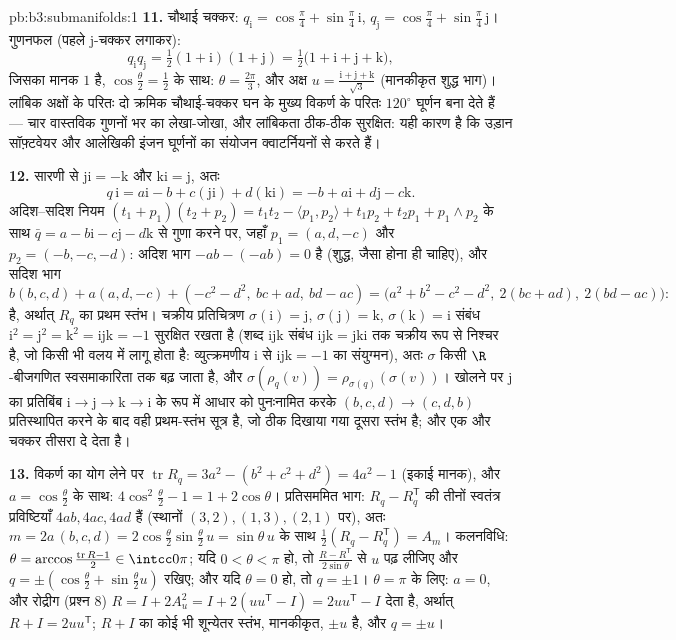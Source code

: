 \begin{solution}{pb:b3:submanifolds:1}
\textbf{11.} चौथाई चक्कर: $q_{\mathrm i} =
\cos\frac\pi4 + \sin\frac\pi4\,\mathrm i$, $q_{\mathrm j} =
\cos\frac\pi4 + \sin\frac\pi4\,\mathrm j$। गुणनफल (पहले $\mathrm j$-चक्कर
लगाकर):
\[
q_{\mathrm i}q_{\mathrm j} = \tfrac12(1 + \mathrm i)(1 +
\mathrm j) = \tfrac12\bigl(1 + \mathrm i + \mathrm j +
\mathrm k\bigr),
\]
जिसका मानक $1$ है, $\cos\frac\theta2 = \frac12$ के साथ: $\theta =
\frac{2\pi}3$, और अक्ष $u = \frac{\mathrm i + \mathrm j +
\mathrm k}{\sqrt3}$ (मानकीकृत
शुद्ध भाग)। लांबिक अक्षों के परितः दो क्रमिक चौथाई-चक्कर घन के मुख्य
विकर्ण के परितः $120^\circ$ घूर्णन बना देते हैं --- चार वास्तविक गुणनों
भर का लेखा-जोखा, और लांबिकता ठीक-ठीक सुरक्षित: यही कारण है कि उड़ान
सॉफ़्टवेयर और आलेखिकी इंजन घूर्णनों का संयोजन क्वाटर्नियनों से करते
हैं।

\textbf{12.} सारणी से $\mathrm{ji} = -\mathrm k$ और $\mathrm{ki} = \mathrm j$, अतः
\[
q\,\mathrm i = a\mathrm i - b + c(\mathrm{ji}) +
d(\mathrm{ki}) = -b + a\mathrm i + d\mathrm j - c\mathrm k .
\]
अदिश--सदिश नियम $(t_1 + p_1)(t_2 +
p_2) = t_1t_2 - \langle p_1, p_2\rangle + t_1p_2 + t_2p_1 +
p_1\wedge p_2$ के साथ $\bar q = a - b\mathrm i - c\mathrm j -
d\mathrm k$ से गुणा करने पर, जहाँ $p_1 = (a, d, -c)$ और
$p_2 = (-b, -c,
-d)$: अदिश भाग $-ab - (-ab) = 0$ है (शुद्ध, जैसा होना ही चाहिए), और सदिश भाग
\[
b(b, c, d) + a(a, d, -c) + (-c^2 - d^2,\ bc + ad,\ bd - ac)
= \bigl(a^2 + b^2 - c^2 - d^2,\ 2(bc + ad),\ 2(bd -
ac)\bigr):
\]
है, अर्थात् $R_q$ का प्रथम स्तंभ। चक्रीय प्रतिचित्रण $\sigma(\mathrm i)
= \mathrm j$, $\sigma(\mathrm j) = \mathrm k$,
$\sigma(\mathrm k) = \mathrm i$ संबंध $\mathrm i^2 = \mathrm j^2 = \mathrm k^2 = \mathrm{ijk} =
-1$ सुरक्षित रखता है (शब्द $\mathrm{ijk}$ संबंध $\mathrm{ijk} = \mathrm{jki}$ तक चक्रीय
रूप से निश्चर है, जो किसी भी वलय में लागू होता है: व्युत्क्रमणीय
$\mathrm i$ से $\mathrm{ijk} = -1$ का संयुग्मन), अतः $\sigma$ किसी $\R$-बीजगणित स्वसमाकारिता
तक बढ़ जाता है, और $\sigma(\rho_q(v)) =
\rho_{\sigma(q)}(\sigma(v))$। खोलने पर $\mathrm j$ का प्रतिबिंब $\mathrm i \to \mathrm j \to \mathrm k \to \mathrm
i$ के रूप
में आधार को पुनःनामित करके $(b, c, d) \to (c, d, b)$ प्रतिस्थापित करने के बाद वही
प्रथम-स्तंभ सूत्र है, जो ठीक दिखाया गया दूसरा स्तंभ है; और एक और
चक्कर तीसरा दे देता है।

\textbf{13.} विकर्ण का योग लेने पर $\operatorname{tr}R_q =
3a^2 - (b^2 + c^2 + d^2) = 4a^2 - 1$ (इकाई मानक), और $a = \cos\frac\theta2$ के
साथ: $4\cos^2\frac\theta2 - 1 = 1 +
2\cos\theta$। प्रतिसममित भाग: $R_q - R_q^{\mathsf T}$ की तीनों स्वतंत्र प्रविष्टियाँ
$4ab, 4ac, 4ad$ हैं (स्थानों $(3,2), (1,3), (2,1)$ पर), अतः $m = 2a\,(b, c, d) =
2\cos\frac\theta2\sin\frac\theta2\,u = \sin\theta\,u$ के साथ $\frac12(R_q -
R_q^{\mathsf T}) = A_m$। कलनविधि: $\theta = \arccos\frac{\operatorname{tr}R -
1}{2} \in \intcc0\pi$;
यदि $0 < \theta < \pi$ हो, तो $\frac{R - R^{\mathsf T}}{2\sin\theta}$ से $u$ पढ़ लीजिए और $q =
\pm(\cos\frac\theta2 + \sin\frac\theta2 u)$ रखिए; और यदि $\theta =
0$
हो, तो $q = \pm1$। $\theta = \pi$ के लिए: $a = 0$, और रोद्रीग (प्रश्न 8) $R = I + 2A_u^2 = I + 2(uu^{\mathsf T} -
I) = 2uu^{\mathsf T} - I$ देता
है, अर्थात् $R + I = 2uu^{\mathsf T}$; $R + I$ का कोई भी शून्येतर स्तंभ, मानकीकृत, $\pm u$
है, और $q = \pm u$।


\end{solution}
